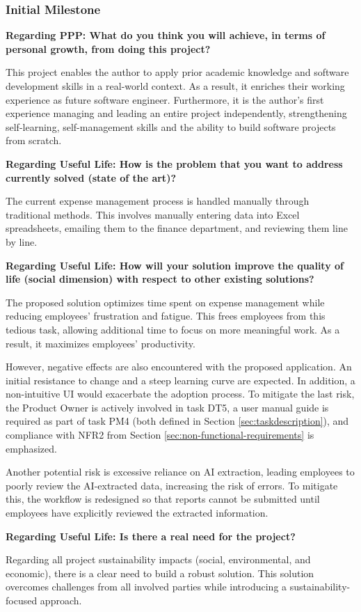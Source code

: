 \subsubsection{Initial Milestone}


\textbf{Regarding PPP: What do you think you will achieve, in terms of personal growth, from doing this project?  }
\vspace{-5pt}

This project enables the author to apply prior academic knowledge and software development skills in a real-world context. As a result, it enriches their working experience as future software engineer. Furthermore, it is the author's first experience managing and leading an entire project independently, strengthening self-learning, self-management skills and the ability to build software projects from scratch.


\textbf{Regarding Useful Life: How is the problem that you want to address currently solved (state of the art)?}
\vspace{-5pt}

The current expense management process is handled manually through traditional methods. This involves manually entering data into Excel spreadsheets, emailing them to the finance department, and reviewing them line by line. 


\textbf{Regarding Useful Life: How will your solution improve the quality of life (social dimension) with respect to other existing solutions? }
\vspace{-5pt}

The proposed solution optimizes time spent on expense management while reducing employees' frustration and fatigue. This frees employees from this tedious task, allowing additional time to focus on more meaningful work. As a result, it maximizes employees' productivity.

However, negative effects are also encountered with the proposed application. An initial resistance to change and a steep learning curve are expected. In addition, a non-intuitive UI would exacerbate the adoption process. To mitigate the last risk, the Product Owner is actively involved in task DT5, a user manual guide is required as part of task PM4 (both defined in Section \ref{sec:taskdescription}), and compliance with NFR2 from Section \ref{sec:non-functional-requirements} is emphasized. 

Another potential risk is excessive reliance on AI extraction, leading employees to poorly review the AI-extracted data, increasing the risk of errors. To mitigate this, the workflow is redesigned so that reports cannot be submitted until employees have explicitly reviewed the extracted information.


\newpage
\textbf{Regarding Useful Life: Is there a real need for the project?}
\vspace{-5pt}

Regarding all project sustainability impacts (social, environmental, and economic), there is a clear need to build a robust solution. This solution overcomes challenges from all involved parties while introducing a sustainability-focused approach.
 